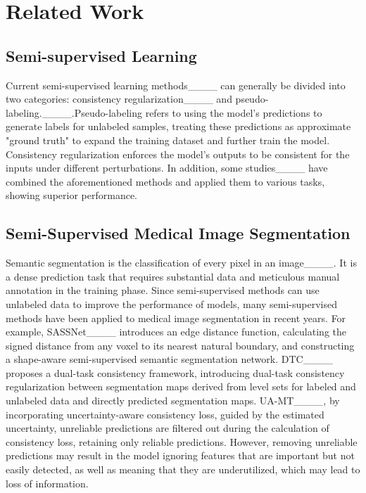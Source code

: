 \section{Related Work}
\subsection{Semi-supervised Learning}
Current semi-supervised learning methods____ can generally be divided into two categories: consistency regularization____ and pseudo-labeling.____.Pseudo-labeling refers to using the model's predictions to generate labels for unlabeled samples, treating these predictions as approximate "ground truth" to expand the training dataset and further train the model. Consistency regularization enforces the model’s outputs to be consistent for the inputs under different perturbations. In addition, some studies____ have combined the aforementioned methods and applied them to various tasks, showing superior performance.

\subsection{Semi-Supervised Medical Image Segmentation}
Semantic segmentation is the classification of every pixel in an image____. It is a dense prediction task that requires substantial data and meticulous manual annotation in the training phase. Since semi-supervised methods can use unlabeled data to improve the performance of models, many semi-supervised methods have been applied to medical image segmentation in recent years. For example, SASSNet____ introduces an edge distance function, calculating the signed distance from any voxel to its nearest natural boundary, and constructing a shape-aware semi-supervised semantic segmentation network. DTC____ proposes a dual-task consistency framework, introducing dual-task consistency regularization between segmentation maps derived from level sets for labeled and unlabeled data and directly predicted segmentation maps. UA-MT____, by incorporating uncertainty-aware consistency loss, guided by the estimated uncertainty, unreliable predictions are filtered out during the calculation of consistency loss, retaining only reliable predictions. However, removing unreliable predictions may result in the model ignoring features that are important but not easily detected, as well as meaning that they are underutilized, which may lead to loss of information.



